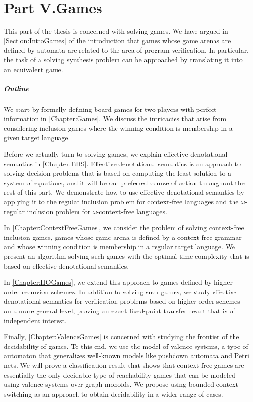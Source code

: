 \documentclass[../../diss.tex]{subfiles}
\begin{document}
\chapter*{Part V.\newline Games}

This part of the thesis is concerned with solving games.
We have argued in \cref{Section:IntroGames} of the introduction that games whose game arenas are defined by automata are related to the area of program verification.
In particular, the task of a solving synthesis problem can be approached by translating it into an equivalent game.

\paragraph{Outline}

We start by formally defining board games for two players with perfect information in \cref{Chapter:Games}.
We discuss the intricacies that arise from considering inclusion games where the winning condition is membership in a given target language.

Before we actually turn to solving games, we explain effective denotational semantics in \cref{Chapter:EDS}.
Effective denotational semantics is an approach to solving decision problems that is based on computing the least solution to a system of equations, and it will be our preferred course of action throughout the rest of this part.
We demonstrate how to use effective denotational semantics by applying it to the regular inclusion problem for context-free languages and the $\omega$-regular inclusion problem for $\omega$-context-free languages.

In \cref{Chapter:ContextFreeGames}, we consider the problem of solving context-free inclusion games, games whose game arena is defined by a context-free grammar and whose winning condition is membership in a regular target language.
We present an algorithm solving such games with the optimal time complexity that is based on effective denotational semantics.

In \cref{Chapter:HOGames}, we extend this approach to games defined by higher-order recursion schemes.
In addition to solving such games, we study effective denotational semantics for verification problems based on higher-order schemes on a more general level, proving an exact fixed-point transfer result that is of independent interest.

Finally, \cref{Chapter:ValenceGames} is concerned with studying the frontier of the decidability of games.
To this end, we use the model of valence systems, a type of automaton that generalizes well-known models like pushdown automata and Petri nets.
We will prove a classification result that shows that context-free games are essentially the only decidable type of reachability games that can be modeled using valence systems over graph monoids.
We propose using bounded context switching as an approach to obtain decidability in a wider range of cases.
\end{document}
